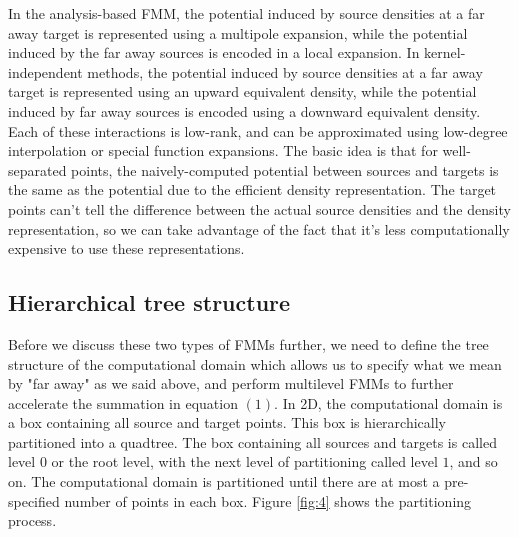\documentclass[11pt, oneside]{article}   	%
\begin{document}
In the analysis-based FMM, the potential induced by source densities at a far away target is represented using a multipole expansion, while the potential induced by the far away sources is encoded in a local expansion. In kernel-independent methods, the potential induced by source densities at a far away target is represented using an upward equivalent density, while the potential induced by far away sources is encoded using a downward equivalent density. Each of these interactions is low-rank, and can be approximated using low-degree interpolation or special function expansions. The basic idea is that for well-separated points, the naively-computed potential between sources and targets is the same as the potential due to the efficient density representation. The target points can't tell the difference between the actual source densities and the density representation, so we can take advantage of the fact that it's less computationally expensive to use these representations.

\subsection{Hierarchical tree structure}
Before we discuss these two types of FMMs further, we need to define the tree structure of the computational domain which allows us to specify what we mean by "far away" as we said above, and perform multilevel FMMs to further accelerate the summation in equation $(1)$. In 2D, the computational domain is a box containing all source and target points. This box is hierarchically partitioned into a quadtree. The box containing all sources and targets is called level $0$ or the root level, with the next level of partitioning called level $1$, and so on. The computational domain is partitioned until there are at most a pre-specified number of points in each box. Figure \ref{fig:4} shows the partitioning process.
\end{document}
